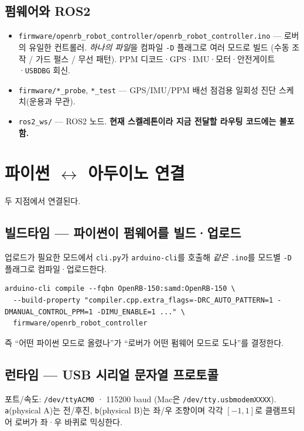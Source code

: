 \documentclass[11pt,a4paper]{article}
\newcommand{\code}[1]{\nolinkurl{#1}}
\newcommand{\cmdcap}[1]{%
  \par\addvspace{5pt}\needspace{4\baselineskip}%
  \noindent{\footnotesize\bfseries #1}\par\nobreak\vspace{2pt}}
\newcommand{\cmdnote}[1]{{\footnotesize\color{muted}#1}\par}
\begin{document}
\subsection{펌웨어와 ROS2}
\begin{itemize}
  \item \code{firmware/openrb_robot_controller/openrb_robot_controller.ino} — 로버의
    유일한 컨트롤러. \emph{하나의 파일}을 컴파일 \code{-D} 플래그로 여러 모드로 빌드
    (수동 조작 / 가드 펄스 / 무선 패턴). PPM 디코드·GPS·IMU·모터·안전게이트·\code{USBDBG} 회신.
  \item \code{firmware/*_probe}, \code{*_test} — GPS/IMU/PPM 배선 점검용 일회성 진단 스케치(운용과 무관).
  \item \code{ros2_ws/} — ROS2 노드. \textbf{현재 스켈레톤이라 지금 전달할 라우팅 코드에는 불포함.}
\end{itemize}

\section{파이썬 $\leftrightarrow$ 아두이노 연결}

두 지점에서 연결된다.

\subsection{빌드타임 — 파이썬이 펌웨어를 빌드·업로드}
업로드가 필요한 모드에서 \code{cli.py}가 \code{arduino-cli}를 호출해 \emph{같은} \code{.ino}를
모드별 \code{-D} 플래그로 컴파일·업로드한다.
\cmdcap{예: 무선 패턴 빌드 플래그}
\begin{lstlisting}[style=cmd]
arduino-cli compile --fqbn OpenRB-150:samd:OpenRB-150 \
  --build-property "compiler.cpp.extra_flags=-DRC_AUTO_PATTERN=1 -DMANUAL_CONTROL_PPM=1 -DIMU_ENABLE=1 ..." \
  firmware/openrb_robot_controller
\end{lstlisting}
\cmdnote{즉 ``어떤 파이썬 모드로 올렸나''가 ``로버가 어떤 펌웨어 모드로 도나''를 결정한다.}

\subsection{런타임 — USB 시리얼 문자열 프로토콜}
포트/속도: \code{/dev/ttyACM0} · 115200 baud (Mac은 \code{/dev/tty.usbmodemXXXX}).
\code{a}(physical A)는 전/후진, \code{b}(physical B)는 좌/우 조향이며 각각 $[-1,1]$로
클램프되어 로버가 좌·우 바퀴로 믹싱한다.
\end{document}
